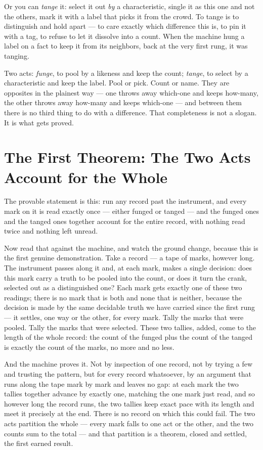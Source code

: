 Or you can \emph{tange} it: select it out \emph{by} a characteristic, single it as this one and not the others,
mark it with a label that picks it from the crowd. To tange is to distinguish and hold apart --- to care exactly
which difference this is, to pin it with a tag, to refuse to let it dissolve into a count. When the machine hung a
label on a fact to keep it from its neighbors, back at the very first rung, it was tanging.

Two acts: \emph{funge}, to pool by a likeness and keep the count; \emph{tange}, to select by a characteristic and keep the
label. Pool or pick. Count or name. They are opposites in the plainest way --- one throws away which-one and
keeps how-many, the other throws away how-many and keeps which-one --- and between them there is no third thing
to do with a difference. That completeness is not a slogan. It is what gets proved.

\section{The First Theorem: The Two Acts Account for the Whole}

The provable statement is this: run any record past the instrument, and every mark on it is read exactly once ---
either funged or tanged --- and the funged ones and the tanged ones together account for the entire record, with
nothing read twice and nothing left unread.

Now read that against the machine, and watch the ground change, because this is the first genuine demonstration.
Take a record --- a tape of marks, however long. The instrument passes along it and, at each mark,
makes a single decision: does this mark carry a truth to be pooled into the count, or does it turn the crank,
selected out as a distinguished one? Each mark gets exactly one of these two readings; there is no mark that is
both and none that is neither, because the decision is made by the same decidable truth we have carried since the
first rung --- it settles, one way or the other, for every mark. Tally the marks that were pooled. Tally the
marks that were selected. These two tallies, added, come to the length of the whole record: the count of the
funged plus the count of the tanged is exactly the count of the marks, no more and no less.

And the machine proves it. Not by inspection of one record, not by trying a few and trusting the pattern, but for
every record whatsoever, by an argument that runs along the tape mark by mark and leaves no gap: at each mark the
two tallies together advance by exactly one, matching the one mark just read, and so however long the record
runs, the two tallies keep exact pace with its length and meet it precisely at the end. There is no record on
which this could fail. The two acts partition the whole --- every mark falls to one act or the other, and the two
counts sum to the total --- and that partition is a theorem, closed and settled, the first earned result.

